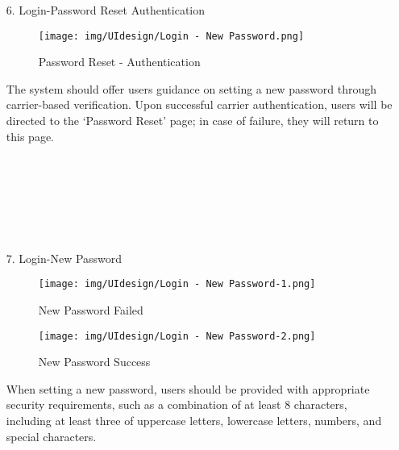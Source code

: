 \documentclass[conference]{IEEEtran}
\begin{document}
\begin{enumerate}
\begin{itemize}
\begin{itemize}
\begin{enumerate}
\begin{enumerate}
    \item[6.] Login-Password Reset Authentication
    \begin{figure}[h]
        {\centering
        \hspace{4cm}
        \begin{minipage}{0.4\columnwidth}
            \texttt{[image: img/UIdesign/Login - New Password.png]}
            \caption{Password Reset - Authentication}
        \end{minipage}}
    \end{figure}
    
    The system should offer users guidance on setting a new password through carrier-based verification. Upon successful carrier authentication, users will be directed to the ‘Password Reset’ page; in case of failure, they will return to this page. \\ \\ \\ \\ \\ \\ \\ 
    
\end{enumerate}



\begin{enumerate}
    \item[7.] Login-New Password
    \begin{figure}[h]
        \centering
        \begin{minipage}{0.4\columnwidth}
            \texttt{[image: img/UIdesign/Login - New Password-1.png]}
            \caption{New Password Failed}
        \end{minipage}
        \hfill
        \begin{minipage}{0.4\columnwidth}
            \texttt{[image: img/UIdesign/Login - New Password-2.png]}
            \caption{New Password Success}
        \end{minipage}
    \end{figure}
    
    When setting a new password, users should be provided with appropriate security requirements, such as a combination of at least 8 characters, including at least three of uppercase letters, lowercase letters, numbers, and special characters.
\end{enumerate}


\end{enumerate}
\end{itemize}
\end{itemize}
\end{enumerate}
\end{document}
